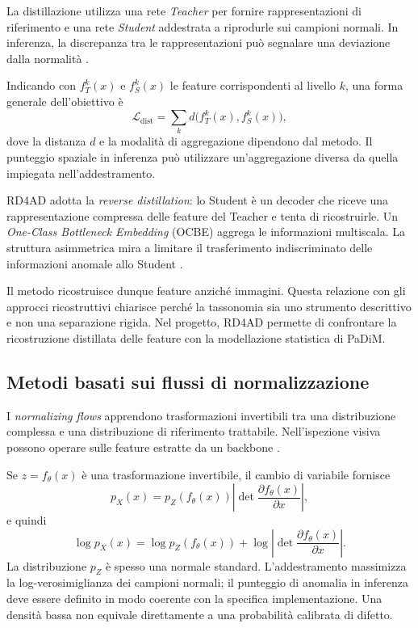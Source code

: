 La distillazione utilizza una rete \textit{Teacher} per fornire rappresentazioni di riferimento e una rete \textit{Student} addestrata a riprodurle sui campioni normali. In inferenza, la discrepanza tra le rappresentazioni può segnalare una deviazione dalla normalità \cite{Cui_et_al._2023}.

Indicando con $f_T^k(x)$ e $f_S^k(x)$ le feature corrispondenti al livello $k$, una forma generale dell'obiettivo è
\[
    \mathcal{L}_{\mathrm{dist}}=
    \sum_k d\bigl(f_T^k(x),f_S^k(x)\bigr),
\]
dove la distanza $d$ e la modalità di aggregazione dipendono dal metodo. Il punteggio spaziale in inferenza può utilizzare un'aggregazione diversa da quella impiegata nell'addestramento.

RD4AD adotta la \textit{reverse distillation}: lo Student è un decoder che riceve una rappresentazione compressa delle feature del Teacher e tenta di ricostruirle. Un \textit{One-Class Bottleneck Embedding} (OCBE) aggrega le informazioni multiscala. La struttura asimmetrica mira a limitare il trasferimento indiscriminato delle informazioni anomale allo Student \cite{Deng_et_al._2022}.

Il metodo ricostruisce dunque feature anziché immagini. Questa relazione con gli approcci ricostruttivi chiarisce perché la tassonomia sia uno strumento descrittivo e non una separazione rigida. Nel progetto, RD4AD permette di confrontare la ricostruzione distillata delle feature con la modellazione statistica di PaDiM.

\subsection{Metodi basati sui flussi di normalizzazione}

I \textit{normalizing flows} apprendono trasformazioni invertibili tra una distribuzione complessa e una distribuzione di riferimento trattabile. Nell'ispezione visiva possono operare sulle feature estratte da un backbone \cite{Cui_et_al._2023}.

Se $z=f_\theta(x)$ è una trasformazione invertibile, il cambio di variabile fornisce
\[
    p_X(x)=p_Z(f_\theta(x))
    \left|\det\frac{\partial f_\theta(x)}{\partial x}\right|,
\]
e quindi
\[
    \log p_X(x)=\log p_Z(f_\theta(x))
    +\log\left|\det\frac{\partial f_\theta(x)}{\partial x}\right|.
\]
La distribuzione $p_Z$ è spesso una normale standard. L'addestramento massimizza la log-verosimiglianza dei campioni normali; il punteggio di anomalia in inferenza deve essere definito in modo coerente con la specifica implementazione. Una densità bassa non equivale direttamente a una probabilità calibrata di difetto.

